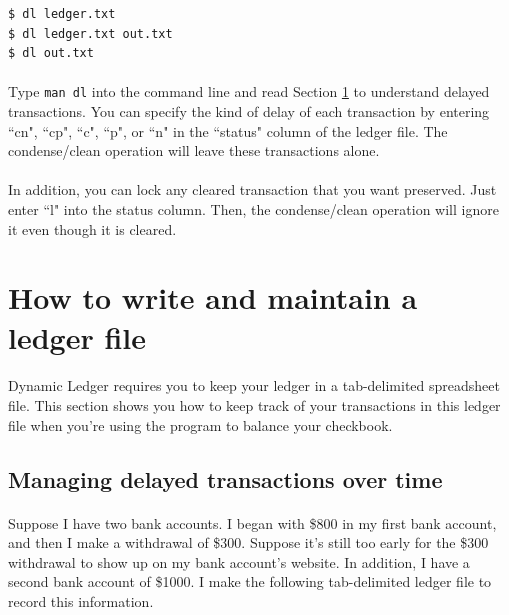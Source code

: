 \documentclass{article}
\begin{document}
\begin{flushleft}
\begin{lstlisting}
$ dl ledger.txt
$ dl ledger.txt out.txt
$ dl out.txt
\end{lstlisting} 

\paragraph{} Type {\tt man dl} into the command line and read Section \ref{sec:file} to understand delayed transactions. You can specify the kind of delay of each transaction by entering ``cn", ``cp", ``c", ``p", or ``n" in the ``status" column of the ledger file. The condense/clean operation will leave these transactions alone. 

\paragraph{} In addition, you can lock any cleared transaction that you want preserved. Just enter ``l" into the status column. Then, the condense/clean operation will ignore it even though it is cleared.



\section{How to write and maintain a ledger file} \label{sec:file}

\paragraph{} Dynamic Ledger requires you to keep your ledger in a tab-delimited spreadsheet file. This section shows you how to keep track of your transactions in this ledger file when you're using the program to balance your checkbook.

\subsection{Managing delayed transactions over time}

\paragraph{} Suppose I have two bank accounts. I began with \$800 in my first bank account, and then I make a withdrawal of \$300. Suppose it's still too early for the \$300 withdrawal to show up on my bank account's website. In addition, I have a second bank account of \$1000. I make the following tab-delimited ledger file to record this information.


\end{flushleft}
\end{document}
